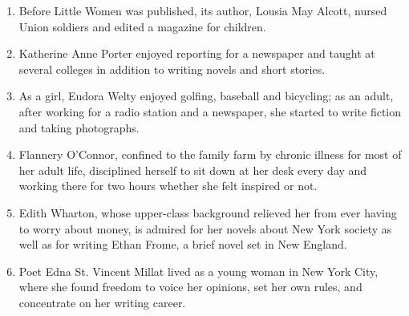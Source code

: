 \documentclass{article}
\begin{document}
\begin{enumerate}
   \item Before Little Women was published, its author, Lousia May
     Alcott, nursed Union soldiers and edited a magazine for children.

   \item Katherine Anne Porter enjoyed reporting for a newspaper and
     taught at several colleges in addition to writing novels and
     short stories.

   \item As a girl, Eudora Welty enjoyed golfing, baseball and
     bicycling; as an adult, after working for a radio station and a
     newspaper, she started to write fiction and taking photographs.

   \item Flannery O'Connor, confined to the family farm by chronic
     illness for most of her adult life, disciplined herself to sit
     down at her desk every day and working there for two hours
     whether she felt inspired or not.
     
   \item Edith Wharton, whose upper-class background relieved her from
     ever having to worry about money, is admired for her novels about
     New York society as well as for writing Ethan Frome, a brief
     novel set in New England.

   \item Poet Edna St. Vincent Millat lived as a young woman in New
     York City, where she found freedom to voice her opinions, set her
     own rules, and concentrate on her writing career.
     
\end{enumerate}
\end{document}
